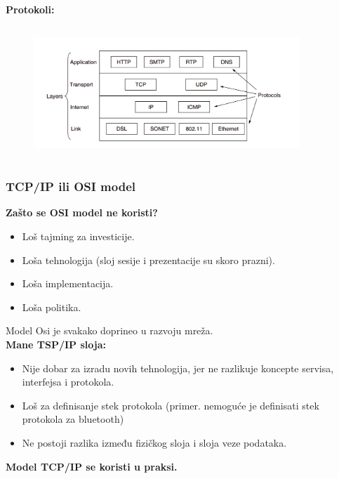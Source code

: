 \documentclass[a4paper]{article}
\begin{document}
            \newpage
            \textbf{Protokoli:}
            \begin{figure}[H]
                \begin{center}
                    \includegraphics[width=100mm,height=50mm]{Slike/svi_protokoli.png}
                \end{center}
            \end{figure}
        \subsubsection{TCP/IP ili OSI model}
            \noindent \textbf{Zašto se OSI model ne koristi?}
            \begin{itemize}
                \item Loš tajming za investicije.
                \item Loša tehnologija (sloj sesije i prezentacije su skoro prazni).
                \item Loša implementacija.
                \item Loša politika.
            \end{itemize}
            Model Osi je svakako doprineo u razvoju mreža.\\

            \textbf{Mane TSP/IP sloja:}
            \begin{itemize}
                \item Nije dobar za izradu novih tehnologija, jer ne razlikuje koncepte
                      servisa, interfejsa i protokola.
                \item Loš za definisanje stek protokola (primer. nemoguće je definisati stek protokola 
                      za bluetooth)
                \item Ne postoji razlika između fizičkog sloja i sloja veze podataka.
            \end{itemize}
            \textbf{Model TCP/IP se koristi u praksi.}
            
\end{document}
